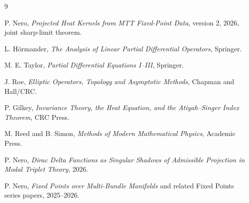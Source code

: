 \documentclass[11pt]{article}
\begin{document}
\begin{thebibliography}{9}

P. Nero, \emph{Projected Heat Kernels from MTT Fixed-Point Data},
version 2, 2026, joint sharp-limit theorem.

L. H{\"o}rmander,
\emph{The Analysis of Linear Partial Differential Operators},
Springer.

M. E. Taylor,
\emph{Partial Differential Equations I--III},
Springer.

J. Roe,
\emph{Elliptic Operators, Topology and Asymptotic Methods},
Chapman and Hall/CRC.

P. Gilkey,
\emph{Invariance Theory, the Heat Equation, and the Atiyah--Singer Index Theorem},
CRC Press.

M. Reed and B. Simon,
\emph{Methods of Modern Mathematical Physics},
Academic Press.

P. Nero,
\emph{Dirac Delta Functions as Singular Shadows of Admissible Projection in Modal Triplet Theory},
2026.

P. Nero,
\emph{Fixed Points over Multi-Bundle Manifolds} and related Fixed Points series papers,
2025--2026.

\end{thebibliography}
\end{document}
